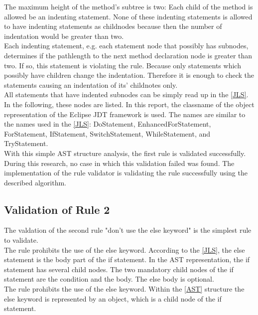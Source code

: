 The maximum height of the method's subtree is two: Each child of the method is allowed be an indenting statement. None of these indenting statements is allowed to have indenting statements as childnodes because then the number of indentation would be greater than two. 
\\

Each indenting statement, e.g. each statement node that possibly has subnodes, determines if the pathlength to the next method declaration node is greater than two. If so, this statement is violating the rule. Because only statements which possibly have children change the indentation. Therefore it is enough to check the statements causing an indentation of its' childnotes only.
\\

All statements that have indented subnodes can be simply read up in the \ref{JLS}. In the following, these nodes are listed. In this report, the classname of the object representation of the Eclipse \acf{JDT} framework is used. The names are similar to the names used in the \ref{JLS}: DoStatement, EnhancedForStatement, ForStatement, IfStatement, SwitchStatement, WhileStatement, and TryStatement. 
\\

With this simple \acf{AST} structure analysis, the first rule is validated successfully. During this research, no case in which this validation failed was found. The implementation of the rule validator is validating the rule successfully using the described algorithm.

\subsection*{Validation of Rule 2}
\label{evaluation:validationruletwo}
The valdation of the second rule "don’t use the else keyword" is the simplest rule to validate.
\\

The rule prohibits the use of the else keyword. According to the \ref{JLS}, the else statement is the body part of the if statement. In the \acf{AST} representation, the if statement has several child nodes. The two mandatory child nodes of the if statement are the condition and the body. The else body is optional. 
\\

The rule prohibits the use of the else keyword. Within the \ref{AST} structure the else keyword is represented by an object, which is a child node of the if statement.
\\


